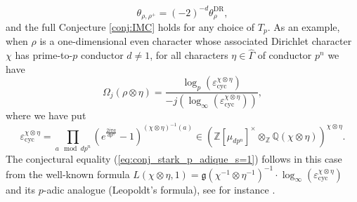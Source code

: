 \documentclass[12pt]{amsart}
\newcommand\bZ{\mathbb{Z}}
\newcommand\bQ{\mathbb{Q}}
\newcommand\g{\mathfrak{g}}
\DeclareMathOperator{\cyc}{cyc}
\newcommand{\DR}{\mathrm{DR}}
\theoremstyle{defstyle}
\theoremstyle{thmstyle}
\begin{document}
$$\theta_{\rho,\rho^+}=(-2)^{-d}\theta_{\rho}^\DR,$$ 
and the full Conjecture \ref{conj:IMC} holds for any choice of $T_p$. As an example, when $\rho$ is a one-dimensional even character whose associated Dirichlet character $\chi$ has prime-to-$p$ conductor $d\neq1$, for all characters $\eta\in\widehat{\Gamma}$ of conductor $p^n$ we have 
$$\Omega_j(\rho\otimes\eta) = \frac{\log_p(\varepsilon^{\chi\otimes\eta}_{\cyc})}{-j\left(\log_\infty(\varepsilon^{\chi\otimes\eta}_{\cyc})\right)},$$
where we have put 
$$\varepsilon^{\chi\otimes\eta}_{\cyc} = \prod_{a \mod dp^n} \left(e^{\frac{2i\pi a}{dp^n}}-1\right)^{(\chi\otimes\eta)^{-1}(a)} \in \left(\bZ[\mu_{dp^n}]^\times \otimes_\bZ \bQ(\chi\otimes\eta)\right)^{\chi\otimes\eta}. $$
The conjectural equality (\ref{eq:conj_stark_p_adique_s=1}) follows in this case from the well-known formula $L(\chi\otimes\eta,1)=\g(\chi^{-1}\otimes\eta^{-1})^{-1}\cdot \log_\infty(\varepsilon^{\chi\otimes\eta}_{\cyc})$ and its $p$-adic analogue (Leopoldt's formula), see for instance \cite[§1.3]{colmezfonctions}.
\end{document}
